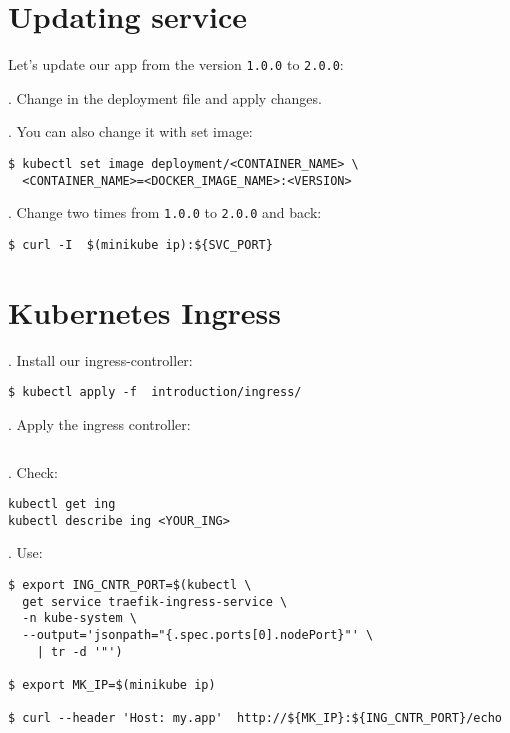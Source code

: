 \documentclass[12pt, letterpaper]{article}
\begin{document}
%
%
%
\section{Updating service}

Let's update our app from the version \verb|1.0.0| to \verb|2.0.0|:

. Change in the deployment file and apply changes.

. You can also change it with set image:

\begin{verbatim}
$ kubectl set image deployment/<CONTAINER_NAME> \
  <CONTAINER_NAME>=<DOCKER_IMAGE_NAME>:<VERSION>
\end{verbatim}

. Change two times from \verb|1.0.0| to \verb|2.0.0| and back:

\begin{verbatim}
$ curl -I  $(minikube ip):${SVC_PORT}
\end{verbatim}

%
%
%
\pagebreak
\section{Kubernetes Ingress}

. Install our ingress-controller:

\begin{verbatim}
$ kubectl apply -f  introduction/ingress/
\end{verbatim}

. Apply the ingress controller:
\inputminted{yaml}{introduction/kube-ingress.yaml}

. Check:

\begin{verbatim}
kubectl get ing
kubectl describe ing <YOUR_ING>
\end{verbatim}

. Use:

\begin{verbatim}
$ export ING_CNTR_PORT=$(kubectl \
  get service traefik-ingress-service \
  -n kube-system \
  --output='jsonpath="{.spec.ports[0].nodePort}"' \
    | tr -d '"')

$ export MK_IP=$(minikube ip)

$ curl --header 'Host: my.app'  http://${MK_IP}:${ING_CNTR_PORT}/echo

\end{verbatim}
\end{document}
